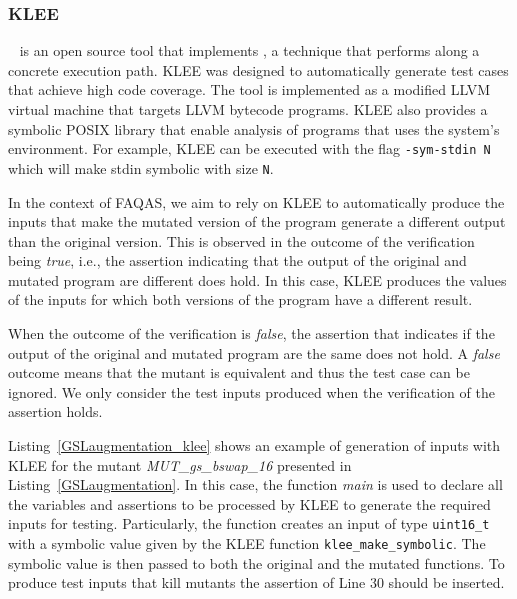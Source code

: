 
\subsubsection{KLEE}

~\cite{cadar2008klee} is an open source tool that implements {}, a technique that performs  along a concrete execution path. KLEE was designed to automatically generate test cases that achieve high code coverage. The tool is implemented as a modified LLVM virtual machine that targets LLVM bytecode programs.
KLEE also provides a symbolic POSIX library that enable analysis of programs that uses the system's environment. For example, KLEE can be executed with the flag \texttt{-sym-stdin N} which will make stdin symbolic with size \texttt{N}.  

In the context of FAQAS, we aim to rely on KLEE to automatically produce the inputs that make the mutated version of the program generate a different output than the original version.
This is observed in the outcome of the verification being \emph{true}, i.e., the assertion indicating that the output of the original and mutated program are different does hold. In this case, KLEE produces the values of the inputs for which both versions of the program have a different result.

When the outcome of the verification is \emph{false}, the assertion that indicates if the output of the original and mutated program are the same does not hold. A \emph{false} outcome means that the mutant is equivalent and thus the test case can be ignored. 
We only consider the test inputs produced when the verification of the assertion holds.



Listing~\ref{GSLaugmentation_klee} shows an example of generation of inputs with KLEE for the mutant \linebreak\emph{MUT\_gs\_bswap\_16} presented in Listing~\ref{GSLaugmentation}. In this case, the function \emph{main} is used to declare all the variables and assertions to be processed by KLEE to generate the required inputs for testing. Particularly, the function creates an input of type \texttt{uint16\_t} with a symbolic value given by the KLEE function \texttt{klee\_make\_symbolic}. The symbolic value is then passed to both the original and the mutated functions. To produce test inputs that kill mutants the assertion of Line 30 should be inserted.

